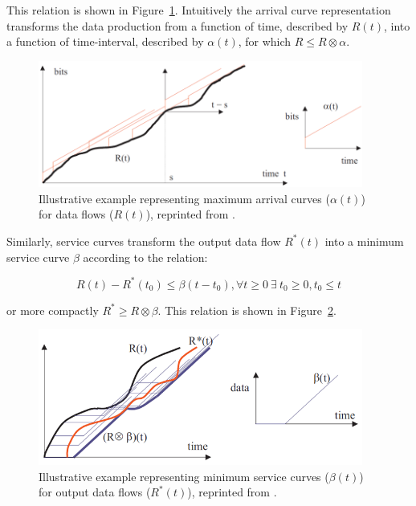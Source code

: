 This relation is shown in Figure~\ref{fig:nc_arrival_curve}.
Intuitively the arrival curve representation transforms the data
production from a function of time, described by $R(t)$, into a
function of time-interval, described by $\alpha(t)$, for which $R\leq
R \otimes \alpha$.

\begin{figure}[htb]
  \centering
  \includegraphics[width=0.95\textwidth]{figs/nc_arrival_curve.png}
  \caption{Illustrative example representing maximum arrival curves
    ($\alpha(t)$) for data flows ($R(t)$), reprinted from
    \cite{NCBook}.}
  \label{fig:nc_arrival_curve}
\end{figure}

Similarly, service curves transform the output data flow $R^*(t)$
into a minimum service curve $\beta$ according to the relation:

\begin{equation}
  R(t)-R^*(t_0)\leq \beta(t-t_0), \forall t\geq 0\ \exists\ t_0\geq
  0,t_0\leq t
\end{equation}

or more compactly $R^*\geq R\otimes\beta$.  This relation is shown in
Figure~\ref{fig:nc_service_curve}.

\begin{figure}[htb]
  \centering
  \includegraphics[width=0.95\textwidth]{figs/nc_service_curve.png}
  \caption{Illustrative example representing minimum service curves
    ($\beta(t)$) for output data flows ($R^*(t)$), reprinted from
    \cite{NCBook}.}
  \label{fig:nc_service_curve}
\end{figure}

